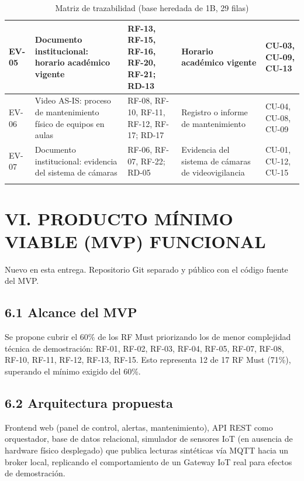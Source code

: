 \begin{longtable}{|p{3.1cm}|p{3.1cm}|p{3.1cm}|p{3.1cm}|p{3.1cm}|}
EV-05 & Documento institucional: horario académico vigente & RF-13, RF-15, RF-16, RF-20, RF-21; RD-13 & Horario académico vigente & CU-03, CU-09, CU-13 \\ \hline
EV-06 & Video AS-IS: proceso de mantenimiento físico de equipos en aulas & RF-08, RF-10, RF-11, RF-12, RF-17; RD-17 & Registro o informe de mantenimiento & CU-04, CU-08, CU-09 \\ \hline
EV-07 & Documento institucional: evidencia del sistema de cámaras & RF-06, RF-07, RF-22; RD-05 & Evidencia del sistema de cámaras de videovigilancia & CU-01, CU-12, CU-15 \\ \hline
\caption{Matriz de trazabilidad (base heredada de 1B, 29 filas)}
\end{longtable}
\endgroup

\section*{VI. PRODUCTO MÍNIMO VIABLE (MVP) FUNCIONAL}


Nuevo en esta entrega. Repositorio Git separado y público con el código fuente del MVP.


\subsection*{6.1 Alcance del MVP}


Se propone cubrir el 60\% de los RF Must priorizando los de menor complejidad técnica de demostración: RF-01, RF-02, RF-03, RF-04, RF-05, RF-07, RF-08, RF-10, RF-11, RF-12, RF-13, RF-15. Esto representa 12 de 17 RF Must (71\%), superando el mínimo exigido del 60\%.


\subsection*{6.2 Arquitectura propuesta}


Frontend web (panel de control, alertas, mantenimiento), API REST como orquestador, base de datos relacional, simulador de sensores IoT (en ausencia de hardware físico desplegado) que publica lecturas sintéticas vía MQTT hacia un broker local, replicando el comportamiento de un Gateway IoT real para efectos de demostración.


